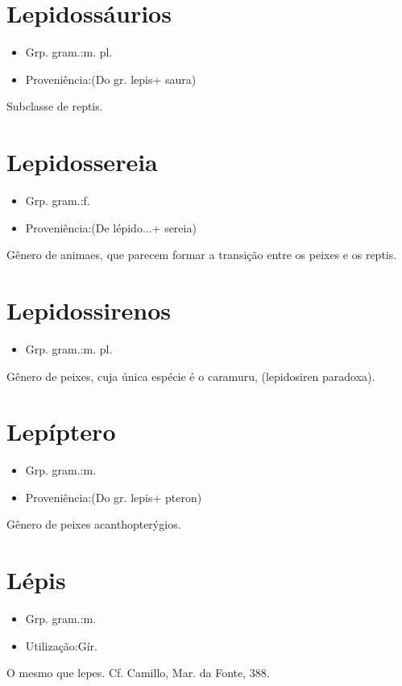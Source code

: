 \section{Lepidossáurios}
\begin{itemize}
\item {Grp. gram.:m. pl.}
\end{itemize}
\begin{itemize}
\item {Proveniência:(Do gr. \textunderscore lepis\textunderscore  + \textunderscore saura\textunderscore )}
\end{itemize}
Subclasse de reptis.
\section{Lepidossereia}
\begin{itemize}
\item {Grp. gram.:f.}
\end{itemize}
\begin{itemize}
\item {Proveniência:(De \textunderscore lépido...\textunderscore  + \textunderscore sereia\textunderscore )}
\end{itemize}
Gênero de animaes, que parecem formar a transição entre os peixes e os reptis.
\section{Lepidossirenos}
\begin{itemize}
\item {Grp. gram.:m. pl.}
\end{itemize}
Gênero de peixes, cuja única espécie é o caramuru, (\textunderscore lepidosiren paradoxa\textunderscore ).
\section{Lepíptero}
\begin{itemize}
\item {Grp. gram.:m.}
\end{itemize}
\begin{itemize}
\item {Proveniência:(Do gr. \textunderscore lepis\textunderscore  + \textunderscore pteron\textunderscore )}
\end{itemize}
Gênero de peixes acanthopterýgios.
\section{Lépis}
\begin{itemize}
\item {Grp. gram.:m.}
\end{itemize}
\begin{itemize}
\item {Utilização:Gír.}
\end{itemize}
O mesmo que \textunderscore lepes\textunderscore . Cf. Camillo, \textunderscore Mar. da Fonte\textunderscore , 388.
